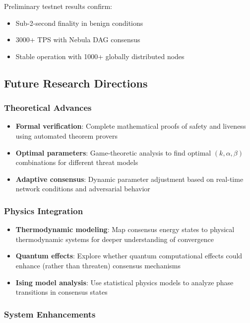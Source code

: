 Preliminary testnet results confirm:
\begin{itemize}
\item Sub-2-second finality in benign conditions
\item 3000+ TPS with Nebula DAG consensus
\item Stable operation with 1000+ globally distributed nodes
\end{itemize}

\subsection{Future Research Directions}

\subsubsection{Theoretical Advances}

\begin{itemize}
\item \textbf{Formal verification}: Complete mathematical proofs of safety and liveness using automated theorem provers
\item \textbf{Optimal parameters}: Game-theoretic analysis to find optimal $(k, \alpha, \beta)$ combinations for different threat models
\item \textbf{Adaptive consensus}: Dynamic parameter adjustment based on real-time network conditions and adversarial behavior
\end{itemize}

\subsubsection{Physics Integration}

\begin{itemize}
\item \textbf{Thermodynamic modeling}: Map consensus energy states to physical thermodynamic systems for deeper understanding of convergence
\item \textbf{Quantum effects}: Explore whether quantum computational effects could enhance (rather than threaten) consensus mechanisms
\item \textbf{Ising model analysis}: Use statistical physics models to analyze phase transitions in consensus states
\end{itemize}

\subsubsection{System Enhancements}

